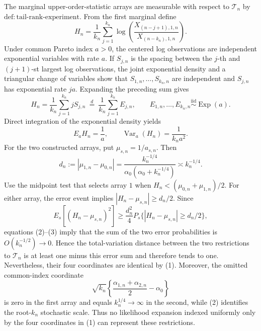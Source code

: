 The marginal upper-order-statistic arrays are measurable with respect to \(\mathcal T_n\) by \(\mathrm{def{:}tail\text{-}rank\text{-}experiment}\).  From the first marginal define
\[
 H_n=\frac1{k_n}\sum_{j=1}^{k_n}
 \log\!\left(\frac{X_{(n-j+1),1,n}}{X_{(n-k_n),1,n}}\right).
\]
Under common Pareto index \(a>0\), the centered log observations are independent exponential variables with rate \(a\).  If \(S_{j,n}\) is the spacing between the \(j\)-th and \((j+1)\)-st largest log observations, the joint exponential density and a triangular change of variables show that \(S_{1,n},\ldots,S_{k_n,n}\) are independent and \(S_{j,n}\) has exponential rate \(ja\).  Expanding the preceding sum gives
\[
 H_n=\frac1{k_n}\sum_{j=1}^{k_n}jS_{j,n}
 \ \stackrel{d}{=}\ \frac1{k_n}\sum_{j=1}^{k_n}E_{j,n},
 \qquad E_{1,n},\ldots,E_{k_n,n}\overset{\mathrm{iid}}{\sim}\operatorname{Exp}(a).
\]
Direct integration of the exponential density yields
\[
 E_aH_n=\frac1a,\qquad
 \operatorname{Var}_a(H_n)=\frac1{k_na^2}. \tag{2}
\]
For the two constructed arrays, put \(\mu_{s,n}=1/a_{s,n}\).  Then
\[
 d_n:=|\mu_{1,n}-\mu_{0,n}|
 =\frac{k_n^{-1/4}}{\alpha_0(\alpha_0+k_n^{-1/4})}
 \asymp k_n^{-1/4}. \tag{3}
\]
Use the midpoint test that selects array \(1\) when \(H_n<(\mu_{0,n}+\mu_{1,n})/2\).  For either array, the error event implies \(|H_n-\mu_{s,n}|\geq d_n/2\).  Since
\[
 E_s[(H_n-\mu_{s,n})^2]
 \geq \frac{d_n^2}{4}
 P_s\{|H_n-\mu_{s,n}|\geq d_n/2\},
\]
equations (2)--(3) imply that the sum of the two error probabilities is \(O(k_n^{-1/2})\to0\).  Hence the total-variation distance between the two restrictions to \(\mathcal T_n\) is at least one minus this error sum and therefore tends to one.  Nevertheless, their four coordinates are identical by (1).  Moreover, the omitted common-index coordinate
\[
 \sqrt{k_n}\left\{\frac{\alpha_{1,n}+\alpha_{2,n}}2-\alpha_0\right\}
\]
is zero in the first array and equals \(k_n^{1/4}\to\infty\) in the second, while (2) identifies the root-\(k_n\) stochastic scale.  Thus no likelihood expansion indexed uniformly only by the four coordinates in (1) can represent these restrictions.

